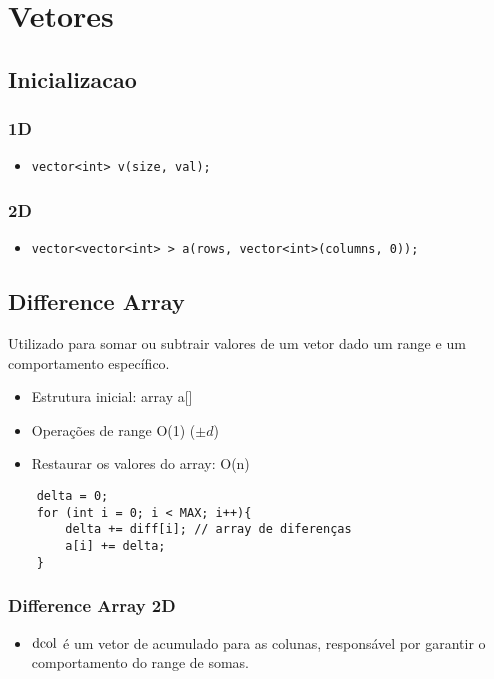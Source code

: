 \section{Vetores}

\subsection{Inicializacao}
\subsubsection{1D}
\begin{itemize}
    \item \lstinline{vector<int> v(size, val);}
\end{itemize}

\subsubsection{2D}
\begin{itemize}
    \item \lstinline{vector<vector<int> > a(rows, vector<int>(columns, 0));}
\end{itemize}

\subsection{Difference Array}
\par Utilizado para somar ou subtrair valores de um vetor dado um range e um comportamento específico.
\begin{itemize}
    \item Estrutura inicial: array a[]
    \item Operações de range O(1) ($\pm d$)
    \item Restaurar os valores do array: O(n)
\end{itemize}

\begin{verbatim}
    delta = 0;
    for (int i = 0; i < MAX; i++){
        delta += diff[i]; // array de diferenças
        a[i] += delta;
    }
\end{verbatim}

\subsubsection{Difference Array 2D}
\begin{itemize}
    \item $\lstinline{dcol}$ é um vetor de acumulado para as colunas, responsável por garantir o comportamento do range de somas.
\end{itemize}

